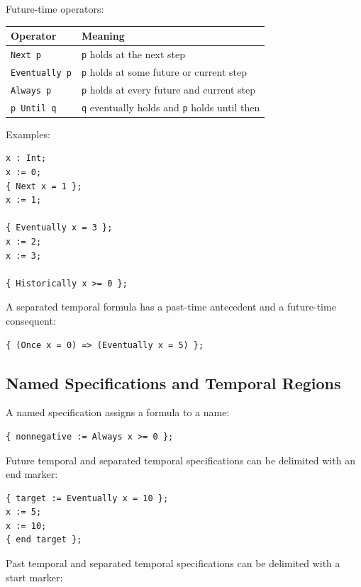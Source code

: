 \documentclass[11pt]{article}
\begin{document}
Future-time operators:

\begin{center}
\begin{tabular}{ll}
\toprule
Operator & Meaning \\
\midrule
\texttt{Next p} & \texttt{p} holds at the next step \\
\texttt{Eventually p} & \texttt{p} holds at some future or current step \\
\texttt{Always p} & \texttt{p} holds at every future and current step \\
\texttt{p Until q} & \texttt{q} eventually holds and \texttt{p} holds until then \\
\bottomrule
\end{tabular}
\end{center}

Examples:

\begin{lstlisting}
x : Int;
x := 0;
{ Next x = 1 };
x := 1;

{ Eventually x = 3 };
x := 2;
x := 3;

{ Historically x >= 0 };
\end{lstlisting}

A separated temporal formula has a past-time antecedent and a future-time consequent:

\begin{lstlisting}
{ (Once x = 0) => (Eventually x = 5) };
\end{lstlisting}

\subsection{Named Specifications and Temporal Regions}

A named specification assigns a formula to a name:

\begin{lstlisting}
{ nonnegative := Always x >= 0 };
\end{lstlisting}

Future temporal and separated temporal specifications can be delimited with an end marker:

\begin{lstlisting}
{ target := Eventually x = 10 };
x := 5;
x := 10;
{ end target };
\end{lstlisting}

Past temporal and separated temporal specifications can be delimited with a start marker:
\end{document}
